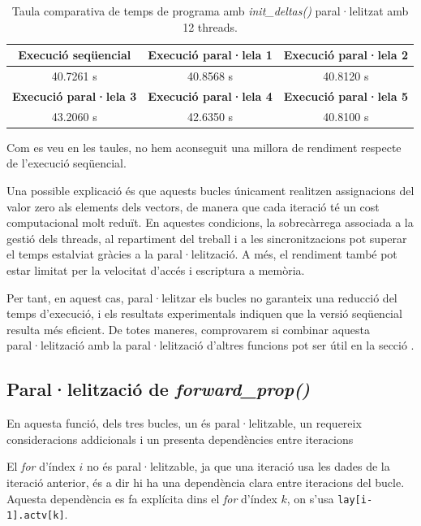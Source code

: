 \documentclass{article}
\begin{document}
\begin{table}[H]
    \centering
    \begin{tabular}{|c|c|c|}
        \hline
        \textbf{Execució seqüencial} & \textbf{Execució paral·lela 1} & \textbf{Execució paral·lela 2} \\ \hline
        40.7261 s & 40.8568 s & 40.8120 s \\ \hline
        \textbf{Execució paral·lela 3} & \textbf{Execució paral·lela 4} & \textbf{Execució paral·lela 5} \\ \hline
        43.2060 s & 42.6350 s & 40.8100 s \\ \hline
    \end{tabular}
    \caption{Taula comparativa de temps de programa amb \textit{init\_deltas()} paral·lelitzat amb 12 threads.}
    \label{tab:f2_12trheads}
\end{table}

Com  es veu en les taules, no hem aconseguit una millora de rendiment respecte de l'execució seqüencial.

Una possible explicació és que aquests bucles únicament realitzen assignacions del valor zero als elements dels vectors, de manera que cada iteració té un cost computacional molt reduït. En aquestes condicions, la sobrecàrrega associada a la gestió dels threads, al repartiment del treball i a les sincronitzacions pot superar el temps estalviat gràcies a la paral·lelització.
A més, el rendiment també pot estar limitat per la velocitat d'accés i escriptura a memòria.

Per tant, en aquest cas, paral·lelitzar els bucles no garanteix una reducció del temps d'execució, i els resultats experimentals indiquen que la versió seqüencial resulta més eficient. De totes  maneres, comprovarem si combinar aquesta paral·lelització amb la paral·lelització d'altres funcions pot ser útil en la secció \texttt{}.

\subsection{Paral·lelització de \textit{forward\_prop()}}

En aquesta funció, dels tres bucles, un és paral·lelitzable, un requereix consideracions addicionals i un presenta dependències entre iteracions

El \textit{for} d'índex $i$ no és paral·lelitzable, ja que una iteració usa les dades de la iteració anterior, és a dir hi ha una dependència clara entre iteracions del bucle. Aquesta dependència es fa explícita dins el \textit{for} d'índex $k$, on s'usa \texttt{lay[i-1].actv[k]}.
\end{document}
